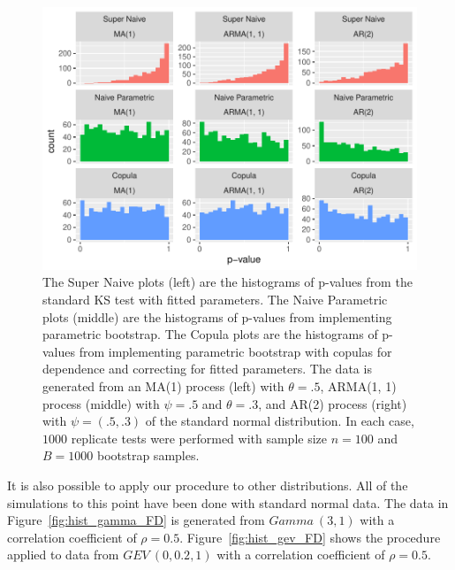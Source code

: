 \documentclass[12pt, letterpaper, titlepage]{article}
\begin{document}
\begin{figure}[tbp]
  \centering
  \includegraphics{hist_ma1_arma_ar2_FD}
  \caption{The Super Naive plots (left) are the histograms of p-values from the 
  standard KS test with fitted parameters. The Naive Parametric plots (middle) 
  are the histograms of p-values from implementing parametric bootstrap. The 
  Copula plots are the histograms of p-values from implementing parametric 
  bootstrap with copulas for dependence and correcting for fitted parameters. 
  The data is generated from an MA(1) process (left) with $\theta = .5$, ARMA(1,
  1) process (middle) with $\psi = .5$ and $\theta = .3$, and AR(2) process 
  (right) with $\psi = (.5, .3)$ of the standard normal distribution. In each 
  case, $1000$ replicate tests were performed with sample size $n = 100$ and 
  $B = 1000$ bootstrap samples.}
  \label{fig:hist_ma1_arma_ar2_FD}
\end{figure}


It is also possible to apply our procedure to other distributions. All of the simulations
to this point have been done with standard normal data. The data in Figure~\ref{fig:hist_gamma_FD} 
is generated from $Gamma ~ (3,1)$ with a correlation coefficient of $\rho = 0.5$. Figure~\ref{fig:hist_gev_FD}
shows the procedure applied to data from $GEV ~ (0, 0.2, 1)$ with a correlation coefficient of $\rho = 0.5$. 
\end{document}

